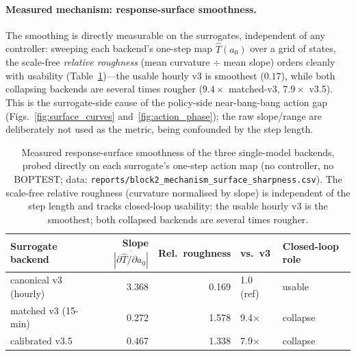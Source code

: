 \documentclass[11pt,a4paper]{article}
\begin{document}
\paragraph{Measured mechanism: response-surface smoothness.} The smoothing is directly measurable on the surrogates, independent of any controller: sweeping each backend's one-step map $\hat T(a_0)$ over a grid of states, the scale-free \emph{relative roughness} (mean curvature $\div$ mean slope) orders cleanly with usability (Table~\ref{tab:surface_sharpness})---the usable hourly v3 is smoothest ($0.17$), while both collapsing backends are several times rougher ($9.4\times$ matched-v3, $7.9\times$ v3.5). This is the surrogate-side cause of the policy-side near-bang-bang action gap (Figs.~\ref{fig:surface_curves} and~\ref{fig:action_phase}); the raw slope/range are deliberately not used as the metric, being confounded by the step length.

\begin{table}[H]
\centering
\caption{Measured response-surface smoothness of the three single-model backends, probed directly on each surrogate's one-step action map (no controller, no BOPTEST; data: \texttt{reports/block2\_mechanism\_surface\_sharpness.csv}). The scale-free relative roughness (curvature normalised by slope) is independent of the step length and tracks closed-loop usability: the usable hourly v3 is the smoothest; both collapsed backends are several times rougher.}
\label{tab:surface_sharpness}
\small
\begin{tabular}{lrrll}
\toprule
Surrogate backend & Slope $\overline{|\partial\hat T/\partial a_0|}$ & Rel.\ roughness & vs.\ v3 & Closed-loop role \\
\midrule
canonical v3 (hourly) & 3.368 & 0.169 & 1.0 (ref) & usable \\
matched v3 (15-min) & 0.272 & 1.578 & 9.4$\times$ & collapse \\
calibrated v3.5 & 0.467 & 1.338 & 7.9$\times$ & collapse \\
\bottomrule
\end{tabular}
\end{table}
\end{document}
